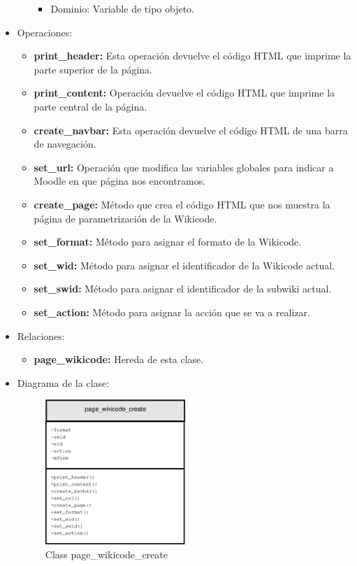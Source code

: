 \begin{itemize}
\begin{itemize}
\begin{itemize}
					\item Dominio: Variable de tipo objeto.
				\end{itemize}
		\end{itemize}
	\item Operaciones:
		\begin{itemize}
			\item \textbf{print\_header: }Esta operación devuelve el código HTML que imprime la parte superior de la página.
			\item \textbf{print\_content: }Operación devuelve el código HTML que imprime la parte central de la página.
			\item \textbf{create\_navbar: }Esta operación devuelve el código HTML de una barra de navegación.
			\item \textbf{set\_url: }Operación que modifica las variables globales para indicar a Moodle en que página nos encontramos.
			\item \textbf{create\_page: }Método que crea el código HTML que nos muestra la página de parametrización de la Wikicode.
			\item \textbf{set\_format: }Método para asignar el formato de la Wikicode.
			\item \textbf{set\_wid: }Método para asignar el identificador de la Wikicode actual.
			\item \textbf{set\_swid: }Método para asignar el identificador de la subwiki actual.
			\item \textbf{set\_action: }Método para asignar la acción que se va a realizar.
		\end{itemize}
	\item Relaciones:
		\begin{itemize}
			\item \textbf{page\_wikicode:} Hereda de esta clase.
		\end{itemize}
	\item Diagrama de la clase:
		\begin{figure}[h]
			\centering
			\includegraphics[width=0.5\textwidth]{./img/page_wikicode_create.eps}
			\caption{Class page\_wikicode\_create}
		\end{figure}
\end{itemize}

